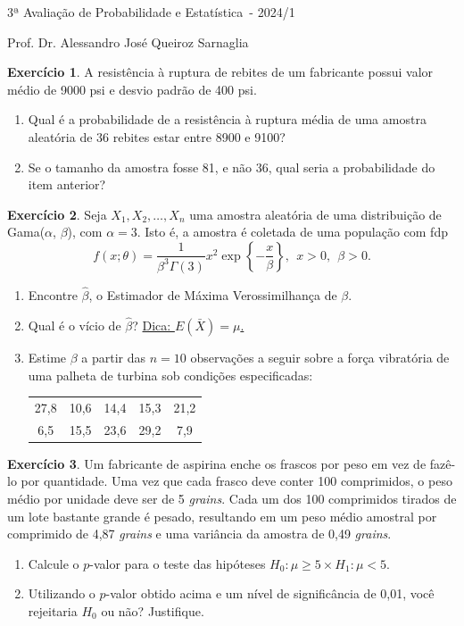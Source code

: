 \documentclass[]{article}
\newcommand{\avaliacao}{3}
\newcommand{\disciplina}{Probabilidade e Estatística}
\newcommand{\semestre}{2024/1}
\theoremstyle{definition}
\newtheorem{ex}{Exercício}
\begin{document}
\thispagestyle{empty}
\begin{center}
\Large{\avaliacao ª Avaliação de \disciplina\ - \semestre}

\large{Prof. Dr. Alessandro José Queiroz Sarnaglia}
\end{center}

\begin{ex}
A resistência à ruptura de rebites de um fabricante possui valor médio de 9000 psi e desvio padrão de 400 psi.
\begin{enumerate}
	\item Qual é a probabilidade de a resistência à ruptura média de uma amostra aleatória de 36 rebites estar entre 8900 e 9100?
	\item Se o tamanho da amostra fosse 81, e não 36, qual seria a probabilidade do item anterior?
\end{enumerate}
\end{ex}


\begin{ex}
Seja $X_1, X_2, \ldots, X_n$ uma amostra aleatória de uma distribuição de Gama($\alpha$, $\beta$), com $\alpha=3$. Isto é, a amostra é coletada de uma população com fdp
$$
f(x;\theta) = \frac{1}{\beta^3\Gamma(3)}x^{2}\exp\left\{-\frac{x}{\beta}\right\}, \ \ x > 0, \ \ \beta>0.
$$
\begin{enumerate}
	\item Encontre $\hat\beta$, o Estimador de Máxima Verossimilhança de $\beta$.
	\item Qual é o vício de $\hat\beta$? \underline{Dica: $E(\bar{X}) = \mu$.}
	\item Estime $\beta$ a partir das $n = 10$ observações a seguir sobre a força vibratória de uma palheta de turbina sob condições especificadas:
	\begin{center}
	\begin{tabular}{ccccc}
		27,8 & 10,6 & 14,4 & 15,3 & 21,2 \\
		6,5 & 15,5 & 23,6 & 29,2 & 7,9\\
	\end{tabular}
	\end{center}
\end{enumerate}
\end{ex}


\begin{ex}
Um fabricante de aspirina enche os frascos por peso em vez de fazê-lo por quantidade. Uma vez que cada frasco deve conter 100 comprimidos, o peso médio por unidade deve ser de 5 \textit{grains}. Cada um dos 100 comprimidos tirados de um lote bastante grande é pesado, resultando em um peso médio amostral por comprimido de 4,87 \textit{grains} e uma variância da amostra de 0,49 \textit{grains}.
\begin{enumerate}
	\item Calcule o $p$-valor para o teste das hipóteses $H_0 : \mu \geq 5 \times H_1 : \mu < 5$.
	\item Utilizando o $p$-valor obtido acima e um nível de significância de 0,01, você rejeitaria $H_0$ ou não? Justifique.
\end{enumerate}
\end{ex}
\end{document}
